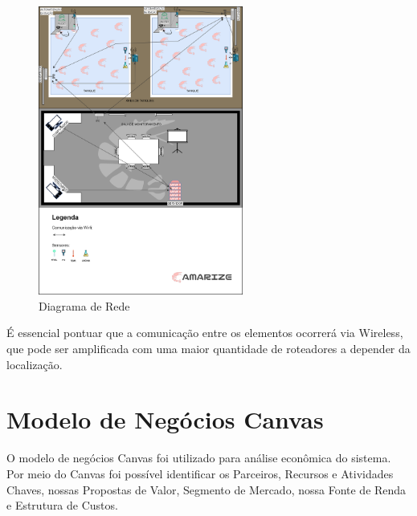 \documentclass[
  a4paper,
  12pt,
  english,
  brazilian,
]{article}
\begin{document}
    
\begin{figure}[h]
\centering
\caption{Diagrama de Rede}%
\label{fig:diagrama-rede}
 \includegraphics[width=0.6\textwidth]{Imagem/Diagrama de Redes.png}
\end{figure}

    \newpage

    É essencial pontuar que a comunicação entre os elementos ocorrerá via Wireless, que pode ser amplificada com uma maior quantidade de roteadores a depender da localização.

    \section*{\textbf{Modelo de Negócios Canvas}}

    O modelo de negócios Canvas foi utilizado para análise econômica do sistema. Por meio do Canvas foi possível identificar os Parceiros, Recursos e Atividades Chaves, nossas Propostas de Valor, Segmento de Mercado, nossa Fonte de Renda e Estrutura de Custos.
\end{document}
